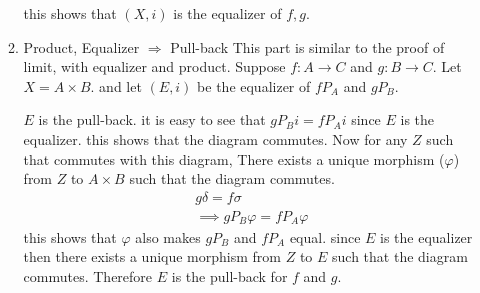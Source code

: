 \begin{enumerate}[label=]
\begin{enumerate}[label=(\textit{\roman*})]
\begin{center}
                \end{center}
                this shows that $(X, i)$ is the equalizer of $f, g$.
            \item 
                Product, Equalizer $\Rightarrow$ Pull-back \newline
                This part is similar to the proof of limit, with equalizer and product.
                Suppose $f: A \to C$ and $g: B \to C$. Let $X = A \times B$. and let $(E, i)$ be the equalizer of $f P_A$ and $g P_B$.
                \begin{center}
                \end{center}
                $E$ is the pull-back. it is easy to see that $g P_B i = f P_A i$ since $E$ is the equalizer. this shows that the diagram commutes.
                Now for any $Z$ such that commutes with this diagram, There exists a unique morphism ($\varphi$) from $Z$ to $A \times B$ such that the diagram commutes.
                \begin{gather*}
                    g \delta = f \sigma \\
                    \implies g P_B \varphi = f P_A \varphi 
                \end{gather*}
                this shows that $\varphi$ also makes $g P_B$ and $ f P_A$ equal.
                since $E$ is the equalizer then there exists a unique morphism from $Z$ to $E$ such that the diagram commutes. Therefore $E$ is the pull-back for $f$ and $g$.
        \end{enumerate}
\end{enumerate}